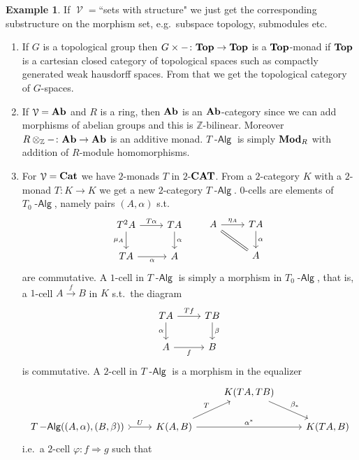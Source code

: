 \documentclass[a4paper,11pt,oneside,openany]{scrbook}
\newcommand{\catname}[1]{{\normalfont\textbf{#1}}}
\DeclareMathOperator{\Alg}{-\mathsf{Alg}}
\newcommand{\Top}{\catname{Top}}
\newcommand{\Ab}{\catname{Ab}}
\newcommand{\Mod}{\catname{Mod}}
\newcommand{\Cat}{\catname{Cat}}
\newcommand{\CAT}{\catname{CAT}}
\DeclareMathOperator{\V}{\mathcal{V}}
\theoremstyle{definition}
\theoremstyle{definition}
\newtheorem{exmp}[thm]{Example}
\begin{document}
\begin{exmp}
If $\V=$``sets with structure" we just get the corresponding substructure on the morphism set, e.g.\ subspace topology, submodules etc.
\begin{enumerate}
    \item If $G$ is a topological group then $G\times-\colon\Top\to\Top$ is a $\Top$-monad if $\Top$ is a cartesian closed category of topological spaces such as compactly generated weak hausdorff spaces. From that we get the topological category of $G$-spaces. 
    \item If $\V=\Ab$ and $R$ is a ring, then $\Ab$ is an $\Ab$-category since we can add morphisms of abelian groups and this is $\mathbb{Z}$-bilinear. Moreover $R\otimes_\mathbb{Z}-\colon\Ab\to\Ab$ is an additive monad. $T\Alg$ is simply $\Mod_R$ with addition of $R$-module homomorphisms. 
    \item For $\V=\Cat$ we have $2$-monads $T$ in $2$-$\CAT$. From a $2$-category $K$ with a $2$-monad $T\colon K\to K$ we get a new $2$-category $T\Alg$.
    $0$-cells are elements of $T_0\Alg$, namely pairs $(A,\alpha)$ s.t.
    \[	
			\begin{tikzcd}
				T^2 A\ar["\mu_{A}"']{d}\ar["T\alpha"]{r}
				& TA\ar["\alpha"]{d} \\
				TA\ar["\alpha"']{r}
				& A
			\end{tikzcd}
			\quad\quad
			\begin{tikzcd}
				A\ar[equal, swap]{dr}\ar["\eta_{A}"]{r}
				& TA\ar["\alpha"]{d} \\
				& A
			\end{tikzcd}
		\]
		are commutative.
A $1$-cell in $T\Alg$ is simply a morphism in $T_0\Alg$, that is, a $1$-cell $A\xrightarrow{f}B$ in $K$ s.t.\ the diagram
	\[
	\begin{tikzcd}
	TA\arrow[d, "\alpha"']\arrow["Tf"]{r}
	& TB\arrow[d, "\beta"]\\
	A\arrow["f"']{r}
	& B
	\end{tikzcd}
	\]
is commutative. A $2$-cell in $T\Alg$ is a morphism in the equalizer
\[
\begin{tikzcd}
&& K(TA,TB) \arrow[rd, "\beta_*"] &  \\
T\Alg((A,\alpha),(B,\beta)) \arrow[r, tail, "U"] & K(A,B) \arrow[rr, "\alpha^*"] \arrow[ru, "T"] &             & K(TA,B)
\end{tikzcd}
\]
i.e.\ a $2$-cell $\varphi\colon f\Rightarrow g$ such that
\[
    \begin{minipage}{0.3\linewidth}
        \begin{tikzcd}[row sep=1cm, column sep=1cm]

\end{tikzcd}
\end{minipage}\]
\end{enumerate}
\end{exmp}
\end{document}
